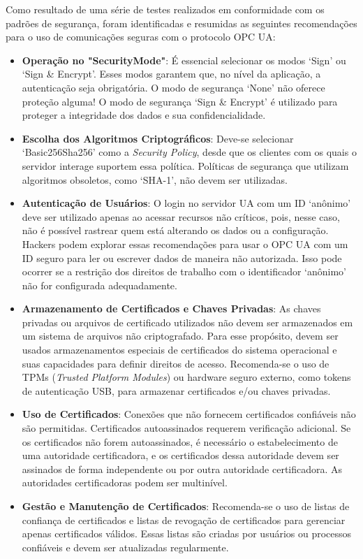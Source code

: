 Como resultado de uma série de testes realizados em conformidade com os padrões de segurança, foram identificadas e resumidas as seguintes recomendações para o uso de comunicações seguras com o protocolo OPC UA:

\begin{itemize}
    \item \textbf{Operação no "SecurityMode"}: É essencial selecionar os modos `Sign' ou `Sign \& Encrypt'. Esses modos garantem que, no nível da aplicação, a autenticação seja obrigatória. O modo de segurança `None' não oferece proteção alguma! O modo de segurança `Sign \& Encrypt' é utilizado para proteger a integridade dos dados e sua confidencialidade.
    \item \textbf{Escolha dos Algoritmos Criptográficos}: Deve-se selecionar `Basic256Sha256' como a \textit{Security Policy}, desde que os clientes com os quais o servidor interage suportem essa política. Políticas de segurança que utilizam algoritmos obsoletos, como `SHA-1', não devem ser utilizadas.
    \item \textbf{Autenticação de Usuários}: O login no servidor UA com um ID `anônimo' deve ser utilizado apenas ao acessar recursos não críticos, pois, nesse caso, não é possível rastrear quem está alterando os dados ou a configuração. Hackers podem explorar essas recomendações para usar o OPC UA com um ID seguro para ler ou escrever dados de maneira não autorizada. Isso pode ocorrer se a restrição dos direitos de trabalho com o identificador `anônimo' não for configurada adequadamente.
    \item \textbf{Armazenamento de Certificados e Chaves Privadas}: As chaves privadas ou arquivos de certificado utilizados não devem ser armazenados em um sistema de arquivos não criptografado. Para esse propósito, devem ser usados armazenamentos especiais de certificados do sistema operacional e suas capacidades para definir direitos de acesso. Recomenda-se o uso de TPMs (\textit{Trusted Platform Modules}) ou hardware seguro externo, como tokens de autenticação USB, para armazenar certificados e/ou chaves privadas.
    \item \textbf{Uso de Certificados}: Conexões que não fornecem certificados confiáveis não são permitidas. Certificados autoassinados requerem verificação adicional. Se os certificados não forem autoassinados, é necessário o estabelecimento de uma autoridade certificadora, e os certificados dessa autoridade devem ser assinados de forma independente ou por outra autoridade certificadora. As autoridades certificadoras podem ser multinível.
    \item \textbf{Gestão e Manutenção de Certificados}: Recomenda-se o uso de listas de confiança de certificados e listas de revogação de certificados para gerenciar apenas certificados válidos. Essas listas são criadas por usuários ou processos confiáveis e devem ser atualizadas regularmente.
\end{itemize}

